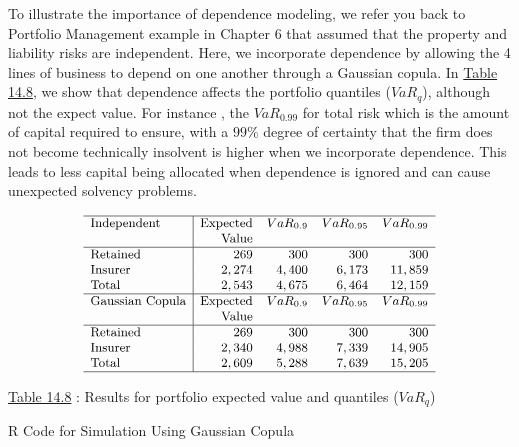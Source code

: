 \documentclass[]{book}
\theoremstyle{definition}
\theoremstyle{definition}
\theoremstyle{definition}
\theoremstyle{remark}
\begin{document}
To illustrate the importance of dependence modeling, we refer you back
to Portfolio Management example in Chapter 6 that assumed that the
property and liability risks are independent. Here, we incorporate
dependence by allowing the 4 lines of business to depend on one another
through a Gaussian copula. In \protect\hyperlink{tab:14.8}{Table 14.8},
we show that dependence affects the portfolio quantiles (\(VaR_q\)),
although not the expect value. For instance , the \(VaR_{0.99}\) for
total risk which is the amount of capital required to ensure, with a
\(99\%\) degree of certainty that the firm does not become technically
insolvent is higher when we incorporate dependence. This leads to less
capital being allocated when dependence is ignored and can cause
unexpected solvency problems.

\[
{\small \begin{matrix}
\begin{array}{l|rrrr} 
    \hline
 \text{Independent} &\text{Expected}   & VaR_{0.9}  & VaR_{0.95}  & VaR_{0.99}  \\
                   &\text{Value}      &            &             &             \\
     \hline              
\text{Retained}    & 269              &  300       & 300         & 300         \\
\text{Insurer}     & 2,274            &  4,400     & 6,173       & 11,859      \\
\text{Total}       & 2,543            &  4,675     & 6,464       & 12,159      \\
   \hline
\text{Gaussian Copula}&\text{Expected}& VaR_{0.9}  & VaR_{0.95}  & VaR_{0.99}  \\
                      &\text{Value}    &           &             &              \\
     \hline                      
\text{Retained}       & 269            &  300      & 300         &  300         \\
\text{Insurer}        & 2,340          &  4,988    & 7,339       & 14,905       \\
\text{Total}          & 2,609          &  5,288    & 7,639       & 15,205       \\
   \hline
\end{array}
\end{matrix}}
\]

\protect\hyperlink{tab:14.8}{Table 14.8} : Results for portfolio
expected value and quantiles (\(VaR_q\))

R Code for Simulation Using Gaussian Copula
\end{document}
